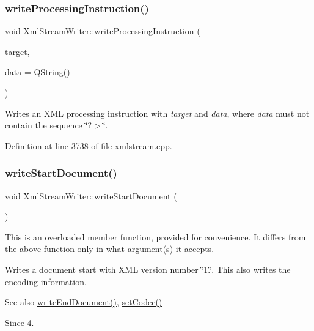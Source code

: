 \subsubsection{\texorpdfstring{write\+Processing\+Instruction()}{writeProcessingInstruction()}}
{\footnotesize\ttfamily void Xml\+Stream\+Writer\+::write\+Processing\+Instruction (\begin{DoxyParamCaption}\item[{const Q\+String \&}]{target,  }\item[{const Q\+String \&}]{data = {\ttfamily QString()} }\end{DoxyParamCaption})}

Writes an X\+ML processing instruction with {\itshape target} and {\itshape data}, where {\itshape data} must not contain the sequence \char`\"{}?$>$\char`\"{}. 

Definition at line 3738 of file xmlstream.\+cpp.

\mbox{\label{class_xml_stream_writer_ae9d5ccf2e94485352e4c1c8843dc0641}} 
\subsubsection{\texorpdfstring{write\+Start\+Document()}{writeStartDocument()}\hspace{0.1cm}{\footnotesize\ttfamily [1/3]}}
{\footnotesize\ttfamily void Xml\+Stream\+Writer\+::write\+Start\+Document (\begin{DoxyParamCaption}{ }\end{DoxyParamCaption})}

This is an overloaded member function, provided for convenience. It differs from the above function only in what argument(s) it accepts.

Writes a document start with X\+ML version number \char`\"{}1.\char`\"{}. This also writes the encoding information.

\begin{DoxySeeAlso}{See also}
\hyperlink{class_xml_stream_writer_a4fa078ed52892cec544e890efb1c3b50}{write\+End\+Document()}, \hyperlink{class_xml_stream_writer_ab73a5ee5db6824afd4a2bc66e8f12e78}{set\+Codec()} 
\end{DoxySeeAlso}
\begin{DoxySince}{Since}
4. 
\end{DoxySince}


